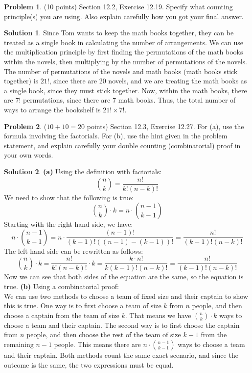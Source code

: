 \documentclass{article}
\theoremstyle{definition}
\newtheorem{problem}{Problem}
\newtheorem*{solution}{Solution}
\begin{document}
\newpage
\begin{problem} (10 points) Section 12.2, Exercise 12.19.  Specify what counting principle(s)
you are using.  Also explain carefully how you got your final answer.
\end{problem}
\begin{solution}
Since Tom wants to keep the math books together, they can be treated as a single book in calculating the number of arrangements.
We can use the multiplication principle by first finding the permutations of the math books within the novels, then multiplying by the number of permutations of the novels.
The number of permutations of the novels and math books (math books stick together) is $21!$,
since there are 20 novels, and we are treating the math books as a single book, since they must stick together.
Now, within the math books, there are $7!$ permutations, since there are 7 math books.
Thus, the total number of ways to arrange the bookshelf is $21! \times 7!$.
\end{solution}

\newpage
\begin{problem} ($10+10=20$ points) Section 12.3, Exercise 12.27.
For (a), use the formula involving the factorials.  For (b), use the hint given in the
problem statement, and explain carefully your double counting (combinatorial) 
proof in your own words.
\end{problem}
\begin{solution}
\textbf{(a)} Using the definition with factorials: \\
$$ \binom{n}{k} = \frac{n!}{k!(n-k)!} $$
We need to show that the following is true:
$$ \binom{n}{k} \cdot k = n \cdot \binom{n-1}{k-1} $$
Starting with the right hand side, we have:
$$ n \cdot \binom{n-1}{k-1} = n \cdot \frac{(n-1)!}{(k-1)!((n-1)-(k-1))!} = \frac{n!}{(k-1)!(n-k)!} $$
The left hand side can be rewritten as follows:
$$ \binom{n}{k} \cdot k = \frac{n!}{k!(n-k)!} \cdot k = \frac{k \cdot n!}{k (k-1)! (n-k)!} = \frac{n!}{(k-1)! (n-k)!} $$
Now we can see that both sides of the equation are the same, so the equation is true.
\newline
\newline
\textbf{(b)} Using a combinatorial proof: \\
We can use two methods to choose a team of fixed size and their captain to show this is true.
One way is to first choose a team of size $k$ from $n$ people, and then choose a captain from the team of size $k$.
That means we have $\binom{n}{k} \cdot k$ ways to choose a team and their captain.
The second way is to first choose the captain from $n$ people, and then choose the rest of the team of size $k-1$ from the remaining $n-1$ people.
This means there are $n \cdot \binom{n-1}{k-1}$ ways to choose a team and their captain.
Both methods count the same exact scenario, and since the outcome is the same, the two expressions must be equal.

\end{solution}
\end{document}
